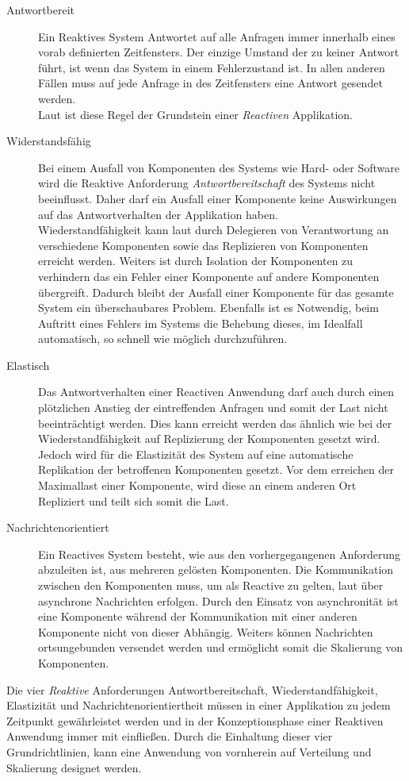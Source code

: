 \begin{description}
    \item[Antwortbereit]\label{reactivo:responsive}
    Ein Reaktives System Antwortet auf alle Anfragen immer innerhalb eines vorab definierten Zeitfensters. Der einzige Umstand der zu keiner Antwort führt, ist wenn das System in einem Fehlerzustand ist. In allen anderen Fällen muss auf jede Anfrage in des Zeitfensters eine Antwort gesendet werden.\\
    Laut \cite{reactiveManifesto} ist diese Regel der Grundstein einer \textit{Reactiven} Applikation.
    \item[Widerstandsfähig]\label{reactivo:resilient}
    Bei einem Ausfall von Komponenten des Systems wie Hard- oder Software wird die Reaktive Anforderung \textit{Antwortbereitschaft} des Systems nicht beeinflusst. Daher darf ein Ausfall einer Komponente keine Auswirkungen auf das Antwortverhalten der Applikation haben.\\
    Wiederstandfähigkeit kann laut \cite{reactiveManifesto} durch Delegieren von Verantwortung an verschiedene Komponenten sowie das Replizieren von Komponenten erreicht werden. Weiters ist durch Isolation der Komponenten zu verhindern das ein Fehler einer Komponente auf andere Komponenten übergreift. Dadurch bleibt der Ausfall einer Komponente für das gesamte System ein überschaubares Problem. Ebenfalls ist es Notwendig, beim Auftritt eines Fehlers im Systems die Behebung dieses, im Idealfall automatisch, so schnell wie möglich durchzuführen.
    \item[Elastisch]\label{reactivo:elastic}
    Das Antwortverhalten einer Reactiven Anwendung darf auch durch einen plötzlichen Anstieg der eintreffenden Anfragen und somit der Last nicht beeinträchtigt werden. Dies kann erreicht werden das ähnlich wie bei der Wiederstandfähigkeit auf Replizierung der Komponenten gesetzt wird. Jedoch wird für die Elastizität des System auf eine automatische Replikation der betroffenen Komponenten gesetzt. Vor dem erreichen der Maximallast einer Komponente, wird diese an einem anderen Ort Repliziert und teilt sich somit die Last. 
    \item[Nachrichtenorientiert]\label{reactivo:messageDriven}
    Ein Reactives System besteht, wie aus den vorhergegangenen Anforderung abzuleiten ist, aus mehreren gelösten Komponenten. Die Kommunikation zwischen den Komponenten muss, um als Reactive zu gelten, laut \cite{reactiveManifesto}  über asynchrone Nachrichten erfolgen. Durch den Einsatz von asynchronität ist eine Komponente während der Kommunikation mit einer anderen Komponente nicht von dieser Abhängig. Weiters können Nachrichten ortsungebunden versendet werden und ermöglicht somit die Skalierung von Komponenten. 
\end{description} 
Die vier \textit{Reaktive} Anforderungen Antwortbereitschaft, Wiederstandfähigkeit, Elastizität und Nachrichtenorientiertheit müssen in einer Applikation zu jedem Zeitpunkt gewährleistet werden und in der Konzeptionsphase einer Reaktiven Anwendung immer mit einfließen. Durch die Einhaltung dieser vier Grundrichtlinien, kann eine Anwendung von vornherein auf Verteilung und Skalierung designet werden.

